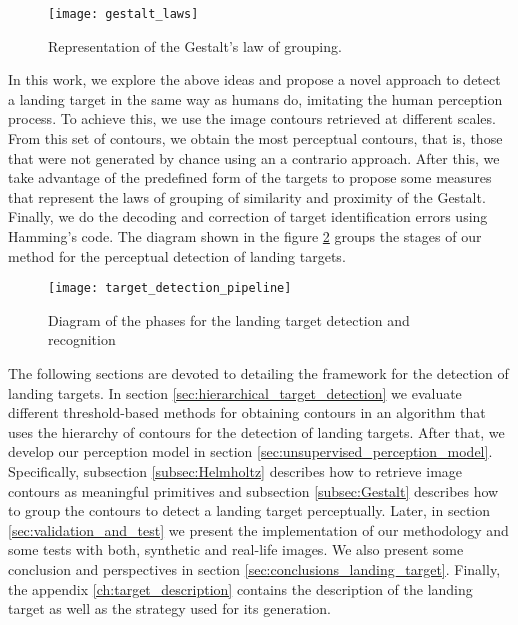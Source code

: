 \begin{figure}[!ht]
    \centering
    \texttt{[image: gestalt\_laws]}        
    \caption{Representation of the Gestalt's law of grouping.}\label{fig:gestalt_laws}
\end{figure}

In this work, we explore the above ideas and propose a novel approach to detect a landing target in the same way as humans do, imitating the human perception process. To achieve this, we use the image contours retrieved at different scales. From this set of contours, we obtain the most perceptual contours, that is, those that were not generated by chance using an a contrario approach. After this, we take advantage of the predefined form of the targets to propose some measures that represent the laws of grouping of similarity and proximity of the Gestalt. Finally, we do the decoding and correction of target identification errors using Hamming's code. The diagram shown in the figure \ref{fig:target_detection_pipeline} groups the stages of our method for the perceptual detection of landing targets.

\begin{figure}[!ht]
    \centering
    \texttt{[image: target\_detection\_pipeline]}        
    \caption{Diagram of the phases for the landing target detection and recognition}\label{fig:target_detection_pipeline}
\end{figure}

The following sections are devoted to detailing the framework for the detection of landing targets. In section \ref{sec:hierarchical_target_detection} we evaluate different threshold-based methods for obtaining contours in an algorithm that uses the hierarchy of contours for the detection of landing targets. After that, we develop our perception model in section \ref{sec:unsupervised_perception_model}. Specifically, subsection \ref{subsec:Helmholtz} describes how to retrieve image contours as meaningful primitives and subsection \ref{subsec:Gestalt} describes how to group the contours to detect a landing target perceptually.  Later, in section \ref{sec:validation_and_test} we present the implementation of our methodology and some tests with both, synthetic and real-life images. We also present some conclusion and perspectives in section \ref{sec:conclusions_landing_target}. Finally, the appendix \ref{ch:target_description} contains the description of the landing target as well as the strategy used for its generation.


